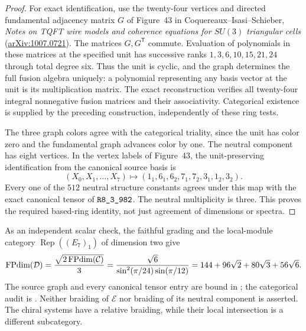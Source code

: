 \begin{proof}
For exact identification, use the twenty-four vertices and directed
fundamental adjacency matrix $G$ of Figure~43 in Coquereaux--Isasi--Schieber,
\emph{Notes on TQFT wire models and coherence equations for $SU(3)$
triangular cells}
(\href{https://arxiv.org/abs/1007.0721}{arXiv:1007.0721}).
The matrices $G,G^{\mathsf T}$ commute. Evaluation of polynomials in
these matrices at the specified unit has successive ranks
$1,3,6,10,15,21,24$ through total degree six. Thus the unit is cyclic,
and the graph determines the full fusion algebra uniquely: a polynomial
representing any basis vector at the unit is its multiplication matrix.
The exact reconstruction verifies all twenty-four integral nonnegative
fusion matrices and their associativity. Categorical existence is supplied
by the preceding construction, independently of these ring tests.

The three graph colors agree with the categorical triality, since the
unit has color zero and the fundamental graph advances color by one.
The neutral component has eight vertices. In the vertex labels of
Figure~43, the unit-preserving identification from the canonical source
basis is
\[
 (X_0,X_1,\ldots,X_7)\longmapsto
 (1_1,6_1,6_2,7_1,7_2,3_1,1_2,3_2).
\]
Every one of the $512$ neutral structure constants agrees under this
map with the exact canonical tensor of $\sha{R8_3_982}$.
The neutral multiplicity is three. This proves the required based-ring
identity, not just agreement of dimensions or spectra.
\end{proof}

As an independent scalar check, the faithful grading and the local-module
category $\operatorname{Rep}((E_7)_1)$ of dimension two give
\[
 \operatorname{FPdim}(\mathcal D)
 =\frac{\sqrt{2\operatorname{FPdim}(\mathcal C)}}3
 =\frac{\sqrt6}{\sin^2(\pi/24)\sin(\pi/12)}
 =144+96\sqrt2+80\sqrt3+56\sqrt6.
\]
The source graph and every canonical tensor entry are bound in
; the categorical audit is
. Neither braiding of $\mathcal E$
nor braiding of its neutral component is asserted. The chiral systems
have a relative braiding, while their local intersection is a different
subcategory.

